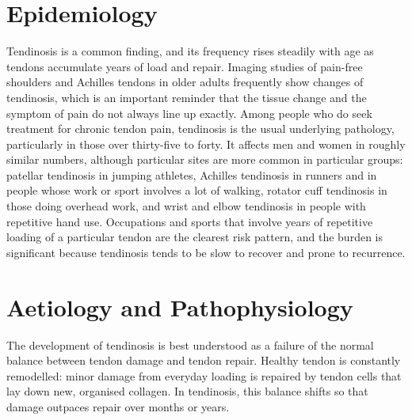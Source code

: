 \section*{Epidemiology}
Tendinosis is a common finding, and its frequency rises steadily with age as tendons accumulate years of load and repair. Imaging studies of pain-free shoulders and Achilles tendons in older adults frequently show changes of tendinosis, which is an important reminder that the tissue change and the symptom of pain do not always line up exactly. Among people who do seek treatment for chronic tendon pain, tendinosis is the usual underlying pathology, particularly in those over thirty-five to forty. It affects men and women in roughly similar numbers, although particular sites are more common in particular groups: patellar tendinosis in jumping athletes, Achilles tendinosis in runners and in people whose work or sport involves a lot of walking, rotator cuff tendinosis in those doing overhead work, and wrist and elbow tendinosis in people with repetitive hand use. Occupations and sports that involve years of repetitive loading of a particular tendon are the clearest risk pattern, and the burden is significant because tendinosis tends to be slow to recover and prone to recurrence.

\section*{Aetiology and Pathophysiology}
The development of tendinosis is best understood as a failure of the normal balance between tendon damage and tendon repair. Healthy tendon is constantly remodelled: minor damage from everyday loading is repaired by tendon cells that lay down new, organised collagen. In tendinosis, this balance shifts so that damage outpaces repair over months or years.

